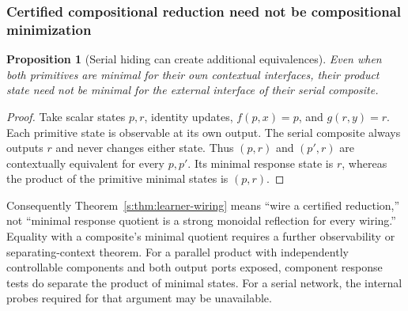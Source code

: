 \documentclass[11pt]{article}
\newtheorem{proposition}[theorem]{Proposition}
\theoremstyle{definition}
\theoremstyle{remark}\newtheorem{remark}[theorem]{Remark}
\begin{document}
\subsubsection{Certified compositional reduction need not be compositional minimization}
\begin{proposition}[Serial hiding can create additional equivalences]
\label{s:prop:serial-minimal}
Even when both primitives are minimal for their own contextual interfaces,
their product state need not be minimal for the external interface of their
serial composite.
\end{proposition}
\begin{proof}
Take scalar states $p,r$, identity updates, $f(p,x)=p$, and $g(r,y)=r$.
Each primitive state is observable at its own output. The serial composite
always outputs $r$ and never changes either state. Thus $(p,r)$ and $(p',r)$
are contextually equivalent for every $p,p'$. Its minimal response state is
$r$, whereas the product of the primitive minimal states is $(p,r)$.
\end{proof}
Consequently Theorem~\ref{s:thm:learner-wiring} means ``wire a certified
reduction,'' not ``minimal response quotient is a strong monoidal
reflection for every wiring.'' Equality with a composite's minimal quotient
requires a further observability or separating-context theorem. For a
parallel product with independently controllable components and both output
ports exposed, component response tests do separate the product of minimal
states. For a serial network, the internal probes required for that argument
may be unavailable.
\end{document}
